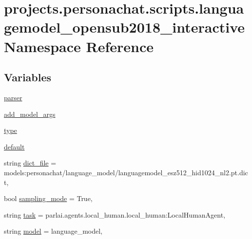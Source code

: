 \hypertarget{namespaceprojects_1_1personachat_1_1scripts_1_1languagemodel__opensub2018__interactive}{}\section{projects.\+personachat.\+scripts.\+languagemodel\+\_\+opensub2018\+\_\+interactive Namespace Reference}
\label{namespaceprojects_1_1personachat_1_1scripts_1_1languagemodel__opensub2018__interactive}
\subsection*{Variables}
\begin{DoxyCompactItemize}
\item 
\hyperlink{namespaceprojects_1_1personachat_1_1scripts_1_1languagemodel__opensub2018__interactive_aa76c1419b8143e493636a2f52f499ddb}{parser}
\item 
\hyperlink{namespaceprojects_1_1personachat_1_1scripts_1_1languagemodel__opensub2018__interactive_ad88a5bed4198d710b0da31a97edb10af}{add\+\_\+model\+\_\+args}
\item 
\hyperlink{namespaceprojects_1_1personachat_1_1scripts_1_1languagemodel__opensub2018__interactive_af9985af118825d310d4927cd29e9e5f0}{type}
\item 
\hyperlink{namespaceprojects_1_1personachat_1_1scripts_1_1languagemodel__opensub2018__interactive_a29f50d0b309eba88012286a072b741a9}{default}
\item 
string \hyperlink{namespaceprojects_1_1personachat_1_1scripts_1_1languagemodel__opensub2018__interactive_af225ecc8b4da5cf39503e9db2ada0136}{dict\+\_\+file} = \textquotesingle{}models\+:personachat/language\+\_\+model/languagemodel\+\_\+esz512\+\_\+hid1024\+\_\+nl2.\+pt.\+dict\textquotesingle{},
\item 
bool \hyperlink{namespaceprojects_1_1personachat_1_1scripts_1_1languagemodel__opensub2018__interactive_ad33d16beb1b04b93907dead76073801c}{sampling\+\_\+mode} = True,
\item 
string \hyperlink{namespaceprojects_1_1personachat_1_1scripts_1_1languagemodel__opensub2018__interactive_a4cc341219534fa75e01ae3afc9f3914f}{task} = \textquotesingle{}parlai.\+agents.\+local\+\_\+human.\+local\+\_\+human\+:\+Local\+Human\+Agent\textquotesingle{},
\item 
string \hyperlink{namespaceprojects_1_1personachat_1_1scripts_1_1languagemodel__opensub2018__interactive_a480cd4e6a5efaaae6f30a6d065365994}{model} = \textquotesingle{}language\+\_\+model\textquotesingle{},

\end{DoxyCompactItemize}
